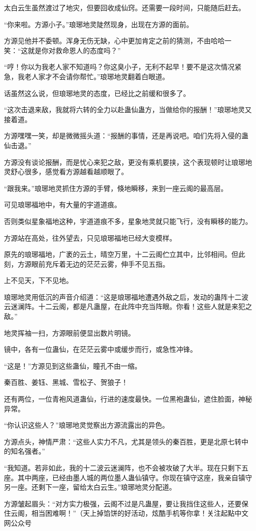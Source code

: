 \begin{this_body}
太白云生虽然渡过了地灾，但要回收成仙窍。还需要一段时间，只能随后赶去。

“你来啦。方源小子。”琅琊地灵陡然现身，出现在方源的面前。

方源见他并不委顿。浑身无伤无缺，心中更加肯定之前的猜测，不由哈哈一笑：“这就是你对救命恩人的态度吗？”

“哼！你以为我老人家不知道吗？你这臭小子，无利不起早！要不是这次情况紧急，我老人家才不会请你帮忙。”琅琊地灵翻着白眼道。

话虽然这么说，但琅琊地灵的态度，已经比之前缓和很多了。

“这次击退来敌，我就将六转的全力以赴蛊仙蛊方，当做给你的报酬！”琅琊地灵又接着道。

方源嘿嘿一笑，却是微微摇头道：“报酬的事情，还是再说吧。咱们先将入侵的蛊仙击退。”

方源没有谈论报酬，而是忧心来犯之敌，更没有乘机要挟，这个表现顿时让琅琊地灵舒心很多，感觉看方源越看越顺眼了。

“跟我来。”琅琊地灵抓住方源的手臂，倏地瞬移，来到一座云阁的最高层。

可见琅琊福地中，有大量的宇道道痕。

否则类似星象福地这种，宇道道痕不多，星象地灵就只能飞行，没有瞬移的能力。

方源站在高处，往外望去，只见琅琊福地已经大变模样。

原先的琅琊福地，广袤的云土，晴空万里，十二云阁伫立其中，比邻相间。但此刻，方源眼前充斥着无边的茫茫云雾，伸手不见五指。

上不见天，下不见地。

琅琊地灵用低沉的声音介绍道：“这是琅琊福地遭遇外敌之后，发动的蛊阵十二波云迷澜阵。十二云阁，都是凡蛊屋，在此阵中充当阵眼。你看！这些人就是来犯之敌。”

地灵挥袖一扫，方源眼前便显出数片明镜。

镜中，各有一位蛊仙，在茫茫云雾中或缓步而行，或急性冲锋。

“这是！”方源见到这些蛊仙，瞳孔不由一缩。

秦百胜、姜钰、黑城、雪松子、贺狼子！

还有两位，一位青袍风道蛊仙，行进的速度最快。一位黑袍蛊仙，遮住脸面，神秘异常。

“你认识这些人？”琅琊地灵觉察出方源流露出的异色。

方源点头，神情严肃：“这些人实力不凡，尤其是领头的秦百胜，更是北原七转中的知名强者。”

“我知道。若非如此，我的十二波云迷澜阵，也不会被攻破了大半。现在只剩下五座。其中两座，已经由墨人城的两位墨人蛊仙镇守。你现在镇守这座，我亲自镇守另一座。还剩下一座，留给太白云生。”琅琊地灵分配道。

方源皱起眉头：“对方实力极强，云阁不过是凡蛊屋，要让我挡住这些人，还要保住云阁，相当困难啊！”（天上掉馅饼的好活动，炫酷手机等你拿！关注起點中文网公众号

\end{this_body}

